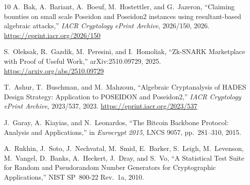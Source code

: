 \documentclass[11pt,a4paper]{article}
\begin{document}
\begin{thebibliography}{10}
A.~Bak, A.~Bariant, A.~Boeuf, M.~Hostettler, and G.~Jazeron,
``Claiming bounties on small scale Poseidon and Poseidon2 instances using resultant-based algebraic attacks,''
\emph{IACR Cryptology ePrint Archive}, 2026/150, 2026.
\url{https://eprint.iacr.org/2026/150}

S.~Oleksak, R.~Gazdik, M.~Peresini, and I.~Homoliak,
``Zk-SNARK Marketplace with Proof of Useful Work,''
arXiv:2510.09729, 2025.
\url{https://arxiv.org/abs/2510.09729}

T.~Ashur, T.~Buschman, and M.~Mahzoun,
``Algebraic Cryptanalysis of HADES Design Strategy: Application to POSEIDON and Poseidon2,''
\emph{IACR Cryptology ePrint Archive}, 2023/537, 2023.
\url{https://eprint.iacr.org/2023/537}

J.~Garay, A.~Kiayias, and N.~Leonardos,
``The Bitcoin Backbone Protocol: Analysis and Applications,''
in \emph{Eurocrypt 2015}, LNCS 9057, pp.~281--310, 2015.

A.~Rukhin, J.~Soto, J.~Nechvatal, M.~Smid, E.~Barker, S.~Leigh, M.~Levenson, M.~Vangel, D.~Banks, A.~Heckert, J.~Dray, and S.~Vo,
``A Statistical Test Suite for Random and Pseudorandom Number Generators for Cryptographic Applications,''
NIST SP~800-22 Rev.~1a, 2010.

\end{thebibliography}
\end{document}
